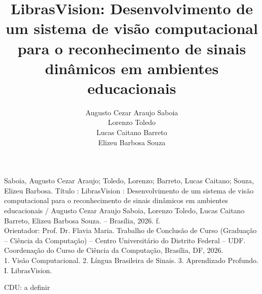 \documentclass[
	10pt,				%
	openany,
    twoside,			%
	a4paper,			%
    chapter={TITLE},
    section={TITLE},
    subsection={TITLE},
    subsubsection={TITLE},
	english,			%
	french,				%
	spanish,			%
	brazil,				%
	sumario=tradicional
]{abntex2}
\title{LibrasVision: Desenvolvimento de um sistema de visão computacional para o reconhecimento de sinais dinâmicos em ambientes educacionais}
\subtitle{}
\author{Augusto Cezar Araujo Saboia \\
    Lorenzo Toledo \\
    Lucas Caitano Barreto \\
    Elizeu Barbosa Souza \\ }
\begin{document}
\pagestyle{empty}
\maketitle
\newpage

\setcounter{page}{1}

\section*{}
\vspace*{80pt}
\begin{center}
\begin{tcolorbox}[
    enhanced,
    sharp corners,
    width=1.0\textwidth,
    colback=white,
    colframe=black,
    boxrule=3pt,
    boxsep=20pt,
    frame style={draw=black, double distance=4pt, double, ultra thick},
    ]
    Saboia, Augusto Cezar Araujo; Toledo, Lorenzo; Barreto, Lucas Caitano; Souza, Elizeu Barbosa.
    \hspace{1cm} Título : LibrasVision : Desenvolvimento de um sistema de visão computacional para o reconhecimento de sinais dinâmicos em ambientes educacionais / Augusto Cezar Araujo Saboia, Lorenzo Toledo, Lucas Caitano Barreto, Elizeu Barbosa Souza. -- Brasília, 2026.
    \hspace{1cm} \pageref{LastPage} f. \\[2mm]
   	Orientador: Prof. Dr. Flavia Maria.
    \hspace{1cm}Trabalho de Conclusão de Curso (Graduação -- Ciência da Computação) -- Centro Universitário do Distrito Federal -- UDF. Coordenação do Curso de Ciência da Computação, Brasília, DF, 2026. \\[2mm]
   	1. Visão Computacional. 2. Língua Brasileira de Sinais. 3. Aprendizado Profundo. I. LibrasVision. \\[2mm]
   	\begin{flushright}
    CDU: a definir
    \end{flushright}
\end{tcolorbox}
\end{center}


\newpage
\section*{}
\end{document}
